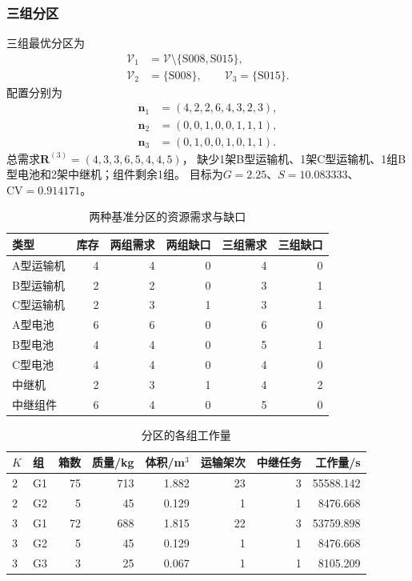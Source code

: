 \documentclass[bwprint]{gmcmthesis}
\begin{document}
\subsubsection{三组分区}
三组最优分区为
\begin{align}
\mathcal V_1&=\mathcal V\setminus\{\mathrm{S008,S015}\},\\
\mathcal V_2&=\{\mathrm{S008}\},\qquad \mathcal V_3=\{\mathrm{S015}\}.
\end{align}
配置分别为
\begin{align}
\boldsymbol n_1&=(4,2,2,6,4,3,2,3),\\
\boldsymbol n_2&=(0,0,1,0,0,1,1,1),\\
\boldsymbol n_3&=(0,1,0,0,1,0,1,1).
\end{align}
总需求$\boldsymbol R^{(3)}=(4,3,3,6,5,4,4,5)$，
缺少1架B型运输机、1架C型运输机、1组B型电池和2架中继机；组件剩余1组。
目标为$G=2.25$、$S=10.083333$、$\mathrm{CV}=0.914171$。
\begin{table}[htbp]
\centering
\small
\caption{两种基准分区的资源需求与缺口}
\label{tab:q4_resources}
\begin{tabular}{lrrrrr}
\toprule
类型 & 库存 & 两组需求 & 两组缺口 & 三组需求 & 三组缺口 \\
\midrule
A型运输机 & 4 & 4 & 0 & 4 & 0 \\
B型运输机 & 2 & 2 & 0 & 3 & 1 \\
C型运输机 & 2 & 3 & 1 & 3 & 1 \\
A型电池 & 6 & 6 & 0 & 6 & 0 \\
B型电池 & 4 & 4 & 0 & 5 & 1 \\
C型电池 & 4 & 4 & 0 & 4 & 0 \\
中继机 & 2 & 3 & 1 & 4 & 2 \\
中继组件 & 6 & 4 & 0 & 5 & 0 \\
\bottomrule
\end{tabular}
\end{table}
\begin{table}[htbp]
\centering
\small
\caption{分区的各组工作量}
\label{tab:q4_workload}
\begin{tabular}{llrrrrrr}
\toprule
$K$ & 组 & 箱数 & 质量/kg & 体积/m$^3$ & 运输架次 & 中继任务 & 工作量/s \\
\midrule
2 & G1 & 75 & 713 & 1.882 & 23 & 3 & 55588.142 \\
2 & G2 & 5 & 45 & 0.129 & 1 & 1 & 8476.668 \\
3 & G1 & 72 & 688 & 1.815 & 22 & 3 & 53759.898 \\
3 & G2 & 5 & 45 & 0.129 & 1 & 1 & 8476.668 \\
3 & G3 & 3 & 25 & 0.067 & 1 & 1 & 8105.209 \\
\bottomrule
\end{tabular}
\end{table}
\end{document}
